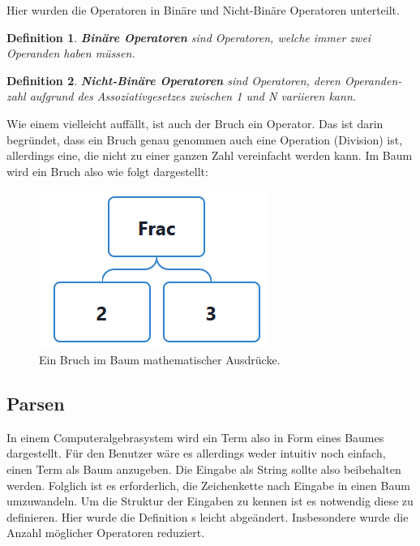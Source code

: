 \documentclass[11pt]{article}
\newtheorem{defin}{Definition}
\begin{document}
Hier wurden die Operatoren in Binäre und Nicht-Binäre Operatoren unterteilt.
\begin{defin}
  \textbf{Binäre Operatoren} sind Operatoren, welche immer zwei Operanden haben müssen.
\end{defin} 
\begin{defin}
  \textbf{Nicht-Binäre Operatoren} sind Operatoren, deren Operanden-zahl aufgrund des
  Assoziativgesetzes zwischen 1 und N variieren kann.
\end{defin}

Wie einem vielleicht auffällt, ist auch der Bruch ein Operator. 
Das ist darin begründet, dass ein Bruch genau genommen auch eine Operation (Division) ist, 
allerdings eine, die nicht zu einer ganzen Zahl vereinfacht werden kann. 
Im Baum wird ein Bruch also wie folgt dargestellt:

\begin{figure}[h]
  \centering
  \includegraphics[scale=0.5]{trees/beispiel_baum_frac.png}
  \caption{Ein Bruch im Baum mathematischer Ausdrücke.}
\end{figure}

\subsection{Parsen}
In einem Computeralgebrasystem wird ein Term also in Form eines Baumes dargestellt. 
Für den Benutzer wäre es allerdings weder intuitiv noch einfach, einen Term als Baum anzugeben. 
Die Eingabe als String sollte also beibehalten werden. 
Folglich ist es erforderlich, die Zeichenkette nach Eingabe in einen Baum umzuwandeln.
Um die Struktur der Eingaben zu kennen ist es notwendig diese zu definieren. Hier wurde
die Definition \citeauthor{CAS_EA}s \cite[86 - 87]{CAS_EA} leicht abgeändert. Insbesondere
wurde die Anzahl möglicher Operatoren reduziert.
\end{document}

